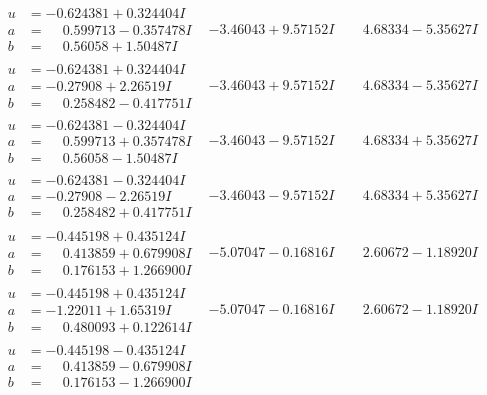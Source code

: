 \documentclass[1p]{elsarticle_modified}
\theoremstyle{definition}
\begin{document}
$$\begin{array}{c|c|c}
\begin{aligned}
u &= -0.624381 + 0.324404 I \\
a &= \phantom{-}0.599713 - 0.357478 I \\
b &= \phantom{-}0.56058 + 1.50487 I\end{aligned}
 & -3.46043 + 9.57152 I & \phantom{-}4.68334 - 5.35627 I \\ \hline\begin{aligned}
u &= -0.624381 + 0.324404 I \\
a &= -0.27908 + 2.26519 I \\
b &= \phantom{-}0.258482 - 0.417751 I\end{aligned}
 & -3.46043 + 9.57152 I & \phantom{-}4.68334 - 5.35627 I \\ \hline\begin{aligned}
u &= -0.624381 - 0.324404 I \\
a &= \phantom{-}0.599713 + 0.357478 I \\
b &= \phantom{-}0.56058 - 1.50487 I\end{aligned}
 & -3.46043 - 9.57152 I & \phantom{-}4.68334 + 5.35627 I \\ \hline\begin{aligned}
u &= -0.624381 - 0.324404 I \\
a &= -0.27908 - 2.26519 I \\
b &= \phantom{-}0.258482 + 0.417751 I\end{aligned}
 & -3.46043 - 9.57152 I & \phantom{-}4.68334 + 5.35627 I \\ \hline\begin{aligned}
u &= -0.445198 + 0.435124 I \\
a &= \phantom{-}0.413859 + 0.679908 I \\
b &= \phantom{-}0.176153 + 1.266900 I\end{aligned}
 & -5.07047 - 0.16816 I & \phantom{-}2.60672 - 1.18920 I \\ \hline\begin{aligned}
u &= -0.445198 + 0.435124 I \\
a &= -1.22011 + 1.65319 I \\
b &= \phantom{-}0.480093 + 0.122614 I\end{aligned}
 & -5.07047 - 0.16816 I & \phantom{-}2.60672 - 1.18920 I \\ \hline\begin{aligned}
u &= -0.445198 - 0.435124 I \\
a &= \phantom{-}0.413859 - 0.679908 I \\
b &= \phantom{-}0.176153 - 1.266900 I\end{aligned}

\end{array}$$
\end{document}

